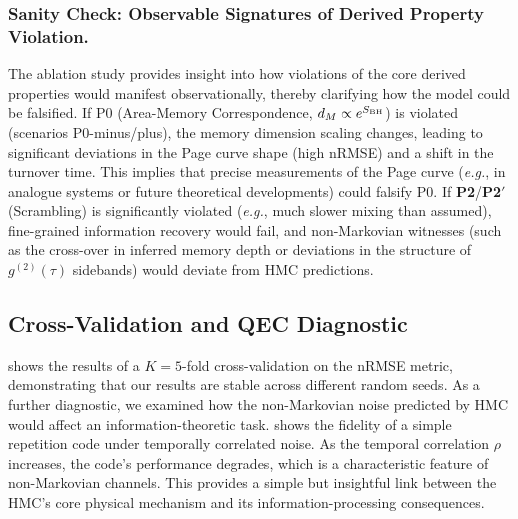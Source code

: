 \documentclass[aps,prd,preprint,onecolumn,superscriptaddress,nofootinbib,longbibliography,floatfix,11pt,showpacs,showkeys]{revtex4-2}
\newcommand{\Ptwo}{\textbf{P2}\xspace}
\newcommand{\PtwoPrime}{\textbf{P2$'$}\xspace}
\newcommand{\eg}{\textit{e.g.}\xspace}
\newcommand{\HMC}{\textsc{HMC}\xspace}
\theoremstyle{plain}
\theoremstyle{definition}
\theoremstyle{remark}
\begin{document}
\subsubsection{Sanity Check: Observable Signatures of Derived Property Violation.}
The ablation study provides insight into how violations of the core derived properties would manifest observationally, thereby clarifying how the model could be falsified. If P0 (Area-Memory Correspondence, $d_M \propto e^{S_{\rm BH}}$) is violated (scenarios P0-minus/plus), the memory dimension scaling changes, leading to significant deviations in the Page curve shape (high nRMSE) and a shift in the turnover time. This implies that precise measurements of the Page curve (\eg, in analogue systems or future theoretical developments) could falsify P0. If \Ptwo/\PtwoPrime{} (Scrambling) is significantly violated (\eg, much slower mixing than assumed), fine-grained information recovery would fail, and non-Markovian witnesses (such as the cross-over in inferred memory depth or deviations in the structure of $g^{(2)}(\tau)$ sidebands) would deviate from \HMC{} predictions.

\subsection{Cross-Validation and QEC Diagnostic}
 shows the results of a $K=5$-fold cross-validation on the nRMSE metric, demonstrating that our results are stable across different random seeds. As a further diagnostic, we examined how the non-Markovian noise predicted by \HMC{} would affect an information-theoretic task.  shows the fidelity of a simple repetition code under temporally correlated noise. As the temporal correlation $\rho$ increases, the code's performance degrades, which is a characteristic feature of non-Markovian channels. This provides a simple but insightful link between the \HMC{}'s core physical mechanism and its information-processing consequences.

\begin{table}[htbp]
\centering
\caption{$K=5$ cross-validation of nRMSE to Page curve (stable across seed subsets).}
\label{tab:cv}
\vspace{0.5em}
\footnotesize
{}
\pgfplotstabletypeset{\datatableCVsummary}
\end{table}
\end{document}
